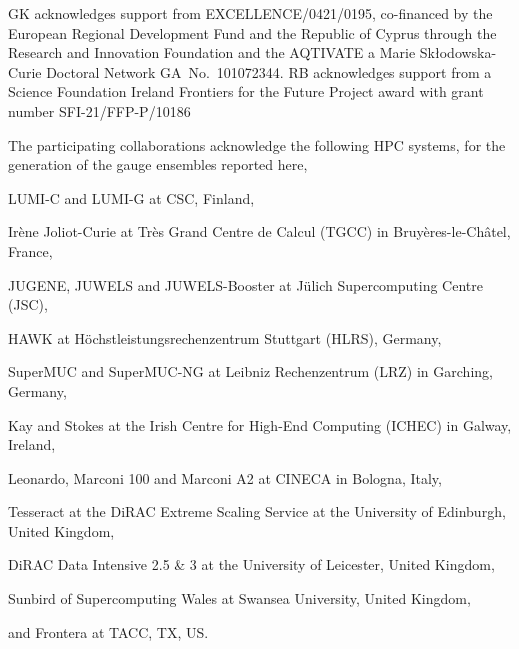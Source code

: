 \documentclass[a4paper,11pt]{article}
\begin{document}
\acknowledgments GK acknowledges support from EXCELLENCE/0421/0195,
co-financed by the European Regional Development Fund and the Republic
of Cyprus through the Research and Innovation Foundation and the
AQTIVATE a Marie Sk\l{}odowska-Curie Doctoral Network
GA~No.~101072344. RB acknowledges support from a Science Foundation Ireland Frontiers for the Future Project award with grant number SFI-21/FFP-P/10186

The participating collaborations acknowledge the following HPC
systems, for the generation of the gauge ensembles reported here,\par
LUMI-C and LUMI-G at CSC, Finland,\par
Irène Joliot-Curie at Très Grand Centre de Calcul (TGCC) in Bruyères-le-Châtel, France,\par
JUGENE, JUWELS and JUWELS-Booster at Jülich Supercomputing Centre (JSC),\par
HAWK at Höchstleistungsrechenzentrum Stuttgart (HLRS), Germany,\par
SuperMUC and SuperMUC-NG at Leibniz Rechenzentrum (LRZ) in Garching, Germany,\par
Kay and Stokes at the Irish Centre for High-End Computing (ICHEC) in Galway, Ireland,\par
Leonardo, Marconi 100 and Marconi A2 at CINECA in Bologna, Italy,\par
Tesseract at the DiRAC Extreme Scaling Service at the University of Edinburgh, United Kingdom,\par
DiRAC Data Intensive 2.5 \& 3 at the University of Leicester, United Kingdom,\par
Sunbird of Supercomputing Wales at Swansea University, United Kingdom,\par
and Frontera at TACC, TX, US.



\end{document}

